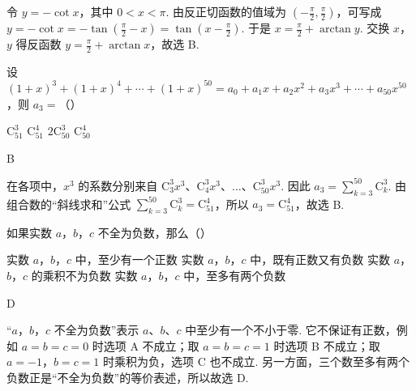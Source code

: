 \begin{solution}
令 \(y=-\cot x\)，其中 \(0<x<\pi\). 由反正切函数的值域为 \(\left(-\frac{\pi}{2},\frac{\pi}{2}\right)\)，可写成
\(y=-\cot x=-\tan\left(\frac{\pi}{2}-x\right)=\tan\left(x-\frac{\pi}{2}\right)\). 于是
\(x=\frac{\pi}{2}+\arctan y\). 交换 \(x\)，\(y\) 得反函数 \(y=\frac{\pi}{2}+\arctan x\)，故选 B.
\end{solution}

\begin{problem}

设 \(\left(1+x\right)^{3}+\left(1+x\right)^{4}+\cdots+\left(1+x\right)^{50}=a_{0}+a_{1}x+a_{2}x^{2}+a_{3}x^{3}+\cdots+a_{50}x^{50}\)，则 \(a_{3}=\)（\quad）

\choices
{\(\mathrm C_{51}^{3}\)}
{\(\mathrm C_{51}^{4}\)}
{\(2\mathrm C_{50}^{3}\)}
{\(\mathrm C_{50}^{4}\)}
\end{problem}

\begin{answer}
B
\end{answer}

\begin{solution}
在各项中，\(x^{3}\) 的系数分别来自
\(\mathrm C_{3}^{3}x^{3}\)、\(\mathrm C_{4}^{3}x^{3}\)、\(\ldots\)、\(\mathrm C_{50}^{3}x^{3}\). 因此 \(a_{3}=\sum_{k=3}^{50}\mathrm C_{k}^{3}\). 由组合数的“斜线求和”公式 \(\sum_{k=3}^{50}\mathrm C_{k}^{3}=\mathrm C_{51}^{4}\)，所以 \(a_{3}=\mathrm C_{51}^{4}\)，故选 B.
\end{solution}

\begin{problem}

如果实数 \(a\)，\(b\)，\(c\) 不全为负数，那么（\quad）

\choices
{实数 \(a\)，\(b\)，\(c\) 中，至少有一个正数}
{实数 \(a\)，\(b\)，\(c\) 中，既有正数又有负数}
{实数 \(a\)，\(b\)，\(c\) 的乘积不为负数}
{实数 \(a\)，\(b\)，\(c\) 中，至多有两个负数}
\end{problem}

\begin{answer}
D
\end{answer}

\begin{solution}
“\(a\)，\(b\)，\(c\) 不全为负数”表示 \(a\)、\(b\)、\(c\) 中至少有一个不小于零. 它不保证有正数，例如 \(a=b=c=0\) 时选项 A 不成立；取 \(a=b=c=1\) 时选项 B 不成立；取 \(a=-1\)，\(b=c=1\) 时乘积为负，选项 C 也不成立. 另一方面，三个数至多有两个负数正是“不全为负数”的等价表述，所以故选 D.
\end{solution}

